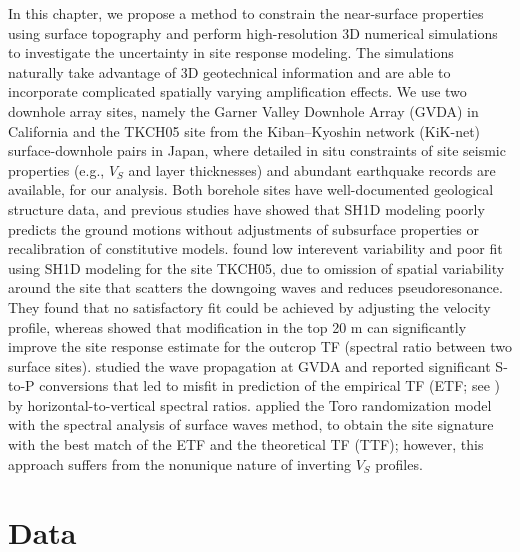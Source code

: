 In this chapter, we propose a method to constrain the near-surface properties using surface topography and perform high-resolution 3D numerical simulations to investigate the uncertainty in site response modeling. The simulations naturally take advantage of 3D geotechnical information and are able to incorporate complicated spatially varying amplification effects. We use two downhole array sites, namely the Garner Valley Downhole Array (GVDA) in California and the TKCH05 site from the Kiban–Kyoshin network (KiK-net) surface-downhole pairs in Japan, where detailed in situ constraints of site seismic properties (e.g., $V_S$ and layer thicknesses) and abundant earthquake records are available, for our analysis. Both borehole sites have well-documented geological structure data, and previous studies have showed that SH1D modeling poorly predicts the ground motions without adjustments of subsurface properties or recalibration of constitutive models. \citet{thompsonTaxonomySiteResponse2012} found low interevent variability and poor fit using SH1D modeling for the site TKCH05, due to omission of spatial variability around the site that scatters the downgoing waves and reduces pseudoresonance. They found that no satisfactory fit could be achieved by adjusting the velocity profile, whereas \citet{taoTaxonomyEvaluatingSitespecific2020} showed that modification in the top 20 m can significantly improve the site response estimate for the outcrop TF (spectral ratio between two surface sites). \citet{bonillaBoreholeResponseStudies2002} studied the wave propagation at GVDA and reported significant S-to-P conversions that led to misfit in prediction of the empirical TF (ETF; see ) by horizontal-to-vertical spectral ratios. \citet{teagueMeasuredVsPredicted2018} applied the Toro randomization model \citep{toroProbabilisticModelsSite1995} with the spectral analysis of surface waves method, to obtain the site signature with the best match of the ETF and the theoretical TF (TTF); however, this approach suffers from the nonunique nature of inverting $V_S$ profiles.


\section{Data}\label{etf:data}


